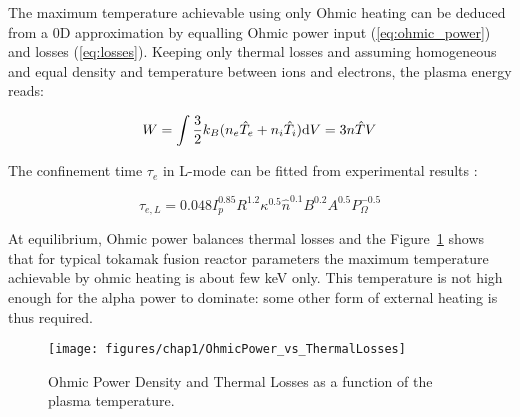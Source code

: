 The maximum temperature achievable using only Ohmic heating can be deduced from a 0D approximation by equalling Ohmic power input (\ref{eq:ohmic_power}) and losses (\ref{eq:losses}). Keeping only thermal losses and assuming homogeneous and equal density and temperature between ions and electrons, the plasma energy reads: 

\begin{equation}\label{eq:plasma_energy}
W 
= \int \frac{3}{2} k_B (n_e \hat T_e + n_i \hat T_i) {\mathrm{d}} V 
=
 3 n \hat{T} V
\end{equation}

The confinement time $\tau_e$ in L-mode can be fitted from experimental results \cite[Eq.(14.155)]{Freidberg2007}:

\begin{equation}\label{eq:tau_e_modeL}
\tau_{e,L}
=
0.048  I_p^{0.85} R^{1.2} \kappa^{0.5} \hat n^{0.1} B^{0.2} A^{0.5} P_\Omega^{-0.5}
\end{equation}  

At equilibrium, Ohmic power balances thermal losses and the Figure~\ref{fig:ohmicpowervsthermallosses} shows that for typical tokamak fusion reactor parameters
the maximum temperature achievable by ohmic heating is about few keV only. This temperature is not high enough for the alpha power to dominate: some other form of external heating is thus required. 

\begin{figure}[h]
	\texttt{[image: figures/chap1/OhmicPower\_vs\_ThermalLosses]}
	\caption{Ohmic Power Density and Thermal Losses as a function of the plasma temperature.}
	\label{fig:ohmicpowervsthermallosses}
\end{figure}


